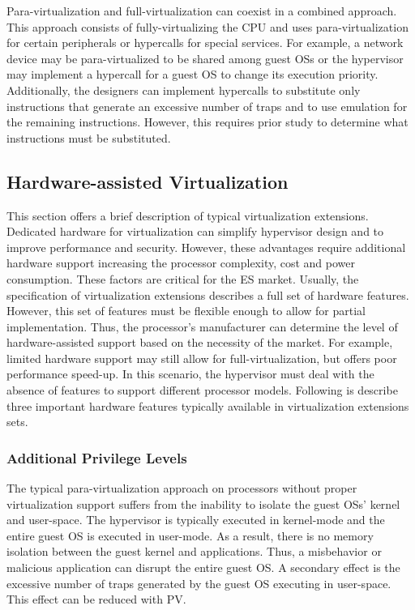 Para-virtualization and full-virtualization can coexist in a combined approach. This approach consists of fully-virtualizing  the CPU and uses para-virtualization for certain peripherals or hypercalls for special services. For example, a network device may be para-virtualized to be shared among guest OSs or the hypervisor may implement a hypercall for a guest OS to change its execution priority. Additionally, the designers can implement hypercalls to substitute only instructions that generate an excessive number of traps and to use emulation for the remaining instructions. However, this requires prior study to determine what instructions must be substituted. 


\subsection{Hardware-assisted Virtualization}
\label{subsection:hardware-assisted}

This section offers a brief description of typical virtualization extensions. Dedicated hardware for virtualization can simplify hypervisor design and to improve performance and security. However, these advantages require additional hardware support increasing the processor complexity, cost and power consumption. These factors are critical for the ES market. Usually, the specification of virtualization extensions describes a full set of hardware features. However, this set of features must be flexible enough to allow for partial implementation. Thus, the processor's manufacturer can determine the level of hardware-assisted support based on the necessity of the market. For example,  limited hardware support may still allow for full-virtualization, but offers poor performance speed-up. In this scenario, the hypervisor must deal with the absence of features to support different processor models. Following is describe three important hardware features typically available in virtualization extensions sets. 

\subsubsection{Additional Privilege Levels}
\label{subsubsection2:privelege}

The typical para-virtualization approach on processors without proper virtualization support suffers from the inability to isolate the guest OSs’ kernel and user-space. The hypervisor is typically executed in kernel-mode and the entire guest OS is executed in user-mode. As a result, there is no memory isolation between the guest kernel and applications. Thus, a misbehavior or malicious application can disrupt the entire guest OS. A secondary effect is the excessive number of traps generated by the guest OS executing in user-space. This effect can be reduced with PV. 

